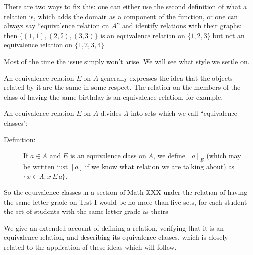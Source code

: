 \documentclass[12pt]{article}
\begin{document}
There are two ways to fix this:  one can either use the second definition of what a relation is, which adds the domain as a component of the function, or one can always say ``equivalence relation on $A$'' and identify relations with their graphs:  then $\{(1,1),(2,2),(3,3)\}$ is an equivalence relation on $\{1,2,3\}$ but not an equivalence relation on 
$\{1,2,3,4\}$.

Most of the time the issue simply won't arise.  We will see what style we settle on.

An equivalence relation $E$ on $A$ generally expresses the idea that the objects related by it are the same in some respect.  The relation on the members of the class of having the same birthday is an equivalence relation, for example.

An equivalence relation $E$ on $A$ divides $A$ into sets which we call ``equivalence classes":

\begin{description}

\item[Definition:]  If $a \in A$ and $E$ is an equivalence class on $A$, we define $[a]_E$ (which may be written just $[a]$ if we know what relation we are talking about) as $\{x \in A:x \, E\, a\}$.

\end{description}

So the equivalence classes in a section of Math XXX under the relation of having the same letter grade on Test I would be no more than five sets, for each student the set of students with the same letter grade as theirs.

We give an extended account of defining a relation, verifying that it is an equivalence relation, and describing its equivalence classes, which is closely related to the application of these ideas which will follow.
\end{document}
